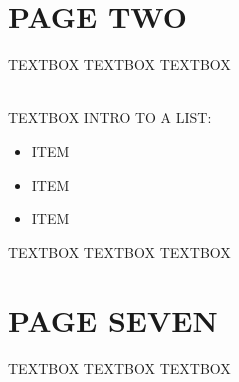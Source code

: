 \documentclass[a4paper,landscape]{article}
\begin{document}
\newpage
\begin{minipage}[t]{0.45\linewidth}%
         \vspace*{0.1\textheight}
        \section*{PAGE TWO}
        \begin{center}
            \parbox{4.5in}{TEXTBOX TEXTBOX TEXTBOX\\\\}
            \parbox{4.5in}{TEXTBOX INTRO TO A LIST:}
              \begin{itemize}
                \item ITEM
                \item ITEM
                \item ITEM
              \end{itemize}
              \parbox{4.5in}{TEXTBOX TEXTBOX TEXTBOX}
    \end{center}
    
\end{minipage}
\hspace{0.75in}
\begin{minipage}[t]{0.45\linewidth}%
    \vspace*{0.1\textheight}
    \section*{PAGE SEVEN}
        \begin{center}
            \parbox{4.5in}{TEXTBOX TEXTBOX TEXTBOX}
        \end{center}%
\end{minipage}


\newpage
\end{document}
